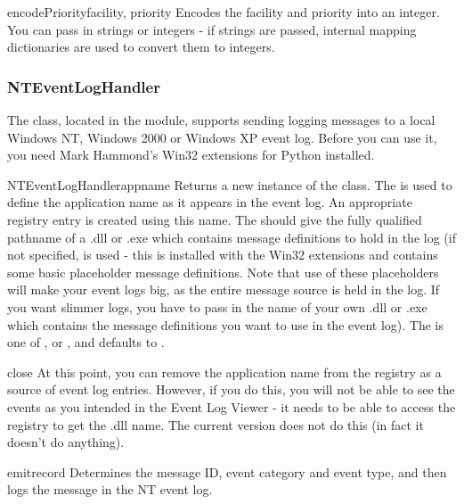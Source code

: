 \begin{methoddesc}{encodePriority}{facility, priority}
Encodes the facility and priority into an integer. You can pass in strings
or integers - if strings are passed, internal mapping dictionaries are used
to convert them to integers.
\end{methoddesc}

\subsubsection{NTEventLogHandler}

The  class, located in the
 module, supports sending logging messages to
a local Windows NT, Windows 2000 or Windows XP event log. Before you
can use it, you need Mark Hammond's Win32 extensions for Python
installed.

\begin{classdesc}{NTEventLogHandler}{appname}
Returns a new instance of the  class. The
 is used to define the application name as it appears in the
event log. An appropriate registry entry is created using this name.
The  should give the fully qualified pathname of a .dll or .exe
which contains message definitions to hold in the log (if not specified,
 is used - this is installed with the Win32
extensions and contains some basic placeholder message definitions.
Note that use of these placeholders will make your event logs big, as the
entire message source is held in the log. If you want slimmer logs, you have
to pass in the name of your own .dll or .exe which contains the message
definitions you want to use in the event log). The  is one of
,  or , and
defaults to .
\end{classdesc}

\begin{methoddesc}{close}{}
At this point, you can remove the application name from the registry as a
source of event log entries. However, if you do this, you will not be able
to see the events as you intended in the Event Log Viewer - it needs to be
able to access the registry to get the .dll name. The current version does
not do this (in fact it doesn't do anything).
\end{methoddesc}

\begin{methoddesc}{emit}{record}
Determines the message ID, event category and event type, and then logs the
message in the NT event log.
\end{methoddesc}

